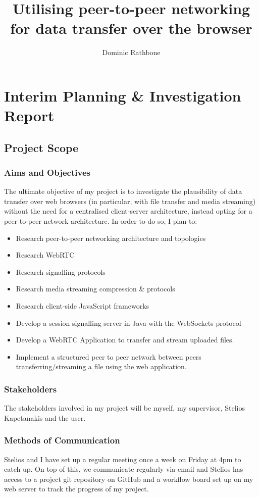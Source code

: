\documentclass[]{report}
\title{Utilising peer-to-peer networking for data transfer over the browser}
\author{Dominic Rathbone}
\begin{document}
\maketitle
\tableofcontents

\chapter{Interim Planning \& Investigation Report}
	\section{Project Scope}
		\subsection*{Aims and Objectives}
			The ultimate objective of my project is to investigate the plausibility of data transfer over web browsers (in particular, with file transfer and media streaming) without the need for a centralised client-server architecture, instead opting for a peer-to-peer network architecture. In order to do so, I plan to:
			\begin{itemize}
				\item Research peer-to-peer networking architecture and topologies
				\item Research WebRTC
				\item Research signalling protocols
				\item Research media streaming compression \& protocols
				\item Research client-side JavaScript frameworks
				\item Develop a session signalling server in Java with the WebSockets protocol
				\item Develop a WebRTC Application to transfer and stream uploaded files.
				\item Implement a structured peer to peer network between peers transferring/streaming a file using the web application.
			\end{itemize}
		\subsection*{Stakeholders}
			The stakeholders involved in my project will be myself, my supervisor, Stelios Kapetanakis and the user.
		\subsection*{Methods of Communication}
			Stelios and I have set up a regular meeting once a week on Friday at 4pm to catch up. On top of this, we communicate regularly via email and Stelios has access to a project git repository on GitHub and a workflow board set up on my web server to track the progress of my project. 
			
\end{document}
